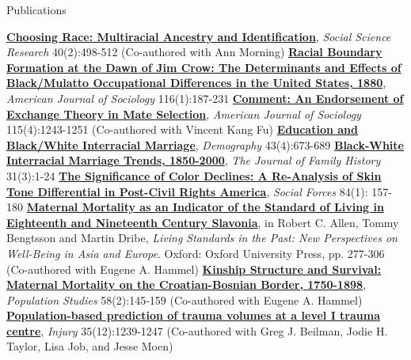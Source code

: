\begin{rubric}{Publications}
\begin{itemize}
\end{itemize}
\entry*[2011] \textbf{\href{http://www.sciencedirect.com/science/article/pii/S0049089X10002899}{Choosing Race: Multiracial Ancestry and Identification}}, \emph{Social Science Research} 40(2):498-512 (Co-authored with Ann Morning) 
\entry*[2010] \textbf{\href{http://www.journals.uchicago.edu/doi/abs/10.1086/652136}{Racial Boundary Formation at the Dawn of Jim Crow: The Determinants and Effects of Black/Mulatto Occupational Differences in the United States, 1880}}, \emph{American Journal of Sociology} 116(1):187-231  
\entry*[2010] \textbf{\href{http://www.journals.uchicago.edu/doi/abs/10.1086/649049?journalCode=ajs}{Comment: An Endorsement of Exchange Theory in Mate Selection}}, \emph{American Journal of Sociology} 115(4):1243-1251 (Co-authored with Vincent Kang Fu) 
\entry*[2006] \textbf{\href{https://www.jstor.org/stable/4137212?seq=1\#page_scan_tab_contents}{Education and Black/White Interracial Marriage}}, \emph{Demography} 43(4):673-689  
\entry*[2006] \textbf{\href{http://jfh.sagepub.com/content/31/3/289.abstract}{Black-White Interracial Marriage Trends, 1850-2000}}, \emph{The Journal of Family History} 31(3):1-24  
\entry*[2005] \textbf{\href{https://academic.oup.com/sf/article-abstract/84/1/157/2234856}{The Significance of Color Declines: A Re-Analysis of Skin Tone Differential in Post-Civil Rights America}}, \emph{Social Forces} 84(1): 157-180  
\entry*[2005] \textbf{\href{http://m.oxfordscholarship.com/view/10.1093/0199280681.001.0001/acprof-9780199280681-chapter-12}{Maternal Mortality as an Indicator of the Standard of Living in Eighteenth and Nineteenth Century Slavonia}}, in Robert C. Allen, Tommy Bengtsson and Martin Dribe, \emph{Living Standards in the Past: New Perspectives on Well-Being in Asia and Europe}. Oxford: Oxford University Press, pp. 277-306 (Co-authored with Eugene A. Hammel) 
\entry*[2004] \textbf{\href{http://escholarship.org/uc/item/45b5r4sc\#page-1}{Kinship Structure and Survival: Maternal Mortality on the Croatian-Bosnian Border, 1750-1898}}, \emph{Population Studies} 58(2):145-159 (Co-authored with Eugene A. Hammel) 
\entry*[2004] \textbf{\href{http://www.sciencedirect.com/science/article/pii/S0020138304001123}{Population-based prediction of trauma volumes at a level I trauma centre}}, \emph{Injury} 35(12):1239-1247 (Co-authored with Greg J. Beilman, Jodie H. Taylor, Lisa Job, and Jesse Moen) 

\end{rubric}